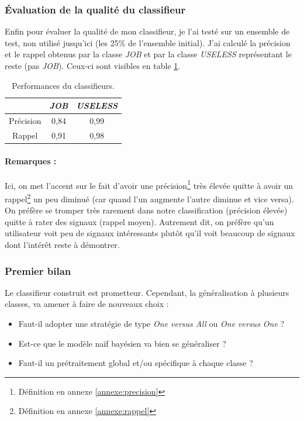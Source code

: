             \subsubsection{Évaluation de la qualité du classifieur}
                Enfin pour évaluer la qualité de mon classifieur, je l'ai testé sur un ensemble de test, non utilisé jusqu'ici (les 25\% de l'ensemble initial). J'ai calculé la précision et le rappel obtenus par la classe \textit{JOB} et par la classe \textit{USELESS} représentant le reste (pas \textit{JOB}). Ceux-ci sont visibles en table \ref{tab:classif_perf}.
                \begin{table}[h]
                    \centering
                    \begin{tabular}{| c | c | c |}
                        \hline
                         & \textit{JOB} & \textit{USELESS} \\
                        \hline
                        Précision & 0,84 & 0,99 \\
                        Rappel & 0,91 & 0,98 \\
                        \hline
                    \end{tabular}
                    \caption{Performances du classifieurs.}
                    \label{tab:classif_perf}
                \end{table}

            \paragraph{Remarques :}
                Ici, on met l'accent sur le fait d'avoir une précision\footnote{Définition en annexe \ref{annexe:precision}} très élevée quitte à avoir un rappel\footnote{Définition en annexe \ref{annexe:rappel}} un peu diminué (car quand l'un augmente l'autre diminue et vice versa). On préfère se tromper très rarement dans notre classification (précision élevée) quitte à rater des signaux (rappel moyen). Autrement dit, on préfère qu'un utilisateur voit peu de signaux intéressants plutôt qu'il voit beaucoup de signaux dont l'intérêt reste à démontrer.

            \subsubsection{Premier bilan}
                Le classifieur construit est prometteur. Cependant, la généralisation à plusieurs classes, va amener à faire de nouveaux choix :
                \begin{itemize}
                    \item Faut-il adopter une stratégie de type \textit{One versus All} ou \textit{One versus One} ?
                    \item Est-ce que le modèle naïf bayésien va bien se généraliser ?
                    \item Faut-il un prétraitement global et/ou spécifique à chaque classe ?
                \end{itemize}

